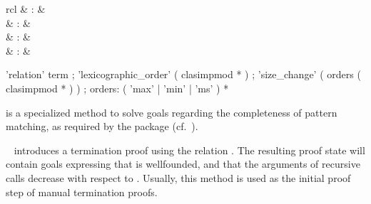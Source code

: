 \begin{isabellebody}
\begin{isamarkuptext}
\begin{description}
  \end{description}%
\end{isamarkuptext}%
\isamarkuptrue%
%
\isamarkuptrue%
%
\begin{isamarkuptext}%
\begin{matharray}{rcl}
    \hypertarget{method.HOL.pat-completeness}{\hyperlink{method.HOL.pat-completeness}{\mbox{}}} & : &  \\
    \hypertarget{method.HOL.relation}{\hyperlink{method.HOL.relation}{\mbox{}}} & : &  \\
    \hypertarget{method.HOL.lexicographic-order}{\hyperlink{method.HOL.lexicographic-order}{\mbox{}}} & : &  \\
    \hypertarget{method.HOL.size-change}{\hyperlink{method.HOL.size-change}{\mbox{}}} & : &  \\
  \end{matharray}

  \begin{rail}
    'relation' term
    ;
    'lexicographic_order' ( clasimpmod * )
    ;
    'size_change' ( orders ( clasimpmod * ) )
    ;
    orders: ( 'max' | 'min' | 'ms' ) *
  \end{rail}

  \begin{description}

  \item \hyperlink{method.HOL.pat-completeness}{\mbox{}} is a specialized method to
  solve goals regarding the completeness of pattern matching, as
  required by the \hyperlink{command.HOL.function}{\mbox{}} package (cf.\
  \cite{isabelle-function}).

  \item \hyperlink{method.HOL.relation}{\mbox{}}~ introduces a termination
  proof using the relation .  The resulting proof state will
  contain goals expressing that  is wellfounded, and that the
  arguments of recursive calls decrease with respect to \isa{R}.
  Usually, this method is used as the initial proof step of manual
  termination proofs.


\end{description}
\end{isamarkuptext}
\end{isabellebody}
